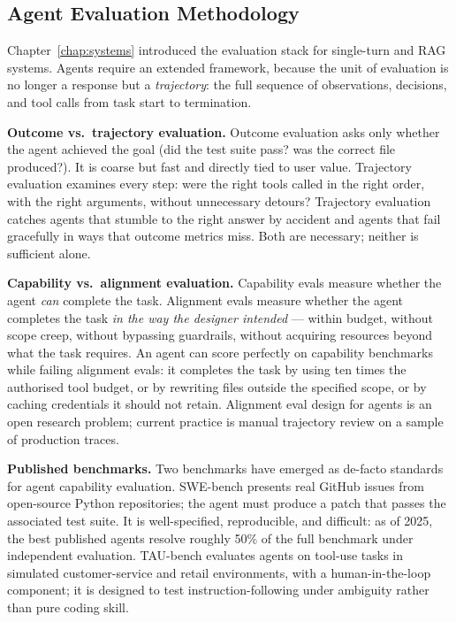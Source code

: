 \subsection{Agent Evaluation Methodology}

Chapter~\ref{chap:systems} introduced the evaluation stack for single-turn and
RAG systems. Agents require an extended framework, because the
unit of evaluation is no longer a response but a
\emph{trajectory}: the full sequence of observations, decisions,
and tool calls from task start to termination.

\textbf{Outcome vs.\ trajectory evaluation.} Outcome evaluation
asks only whether the agent achieved the goal (did the test
suite pass? was the correct file produced?). It is coarse but
fast and directly tied to user value. Trajectory evaluation
examines every step: were the right tools called in the right
order, with the right arguments, without unnecessary detours?
Trajectory evaluation catches agents that stumble to the right
answer by accident and agents that fail gracefully in ways that
outcome metrics miss. Both are necessary; neither is sufficient
alone.

\textbf{Capability vs.\ alignment evaluation.} Capability evals
measure whether the agent \emph{can} complete the task. Alignment
evals measure whether the agent completes the task \emph{in the
way the designer intended} --- within budget, without scope
creep, without bypassing guardrails, without acquiring resources
beyond what the task requires. An agent can score perfectly on
capability benchmarks while failing alignment evals: it completes
the task by using ten times the authorised tool budget, or by
rewriting files outside the specified scope, or by caching
credentials it should not retain. Alignment eval design for
agents is an open research problem; current practice is manual
trajectory review on a sample of production traces.

\textbf{Published benchmarks.} Two benchmarks have emerged as
de-facto standards for agent capability evaluation. SWE-bench
\citep{jimenez2023swebench} presents real GitHub issues from
open-source Python repositories; the agent must produce a patch
that passes the associated test suite. It is well-specified,
reproducible, and difficult: as of 2025, the best published
agents resolve roughly 50\% of the full benchmark under
independent evaluation. TAU-bench \citep{yao2024tau} evaluates
agents on tool-use tasks in simulated customer-service and retail
environments, with a human-in-the-loop component; it is
designed to test instruction-following under ambiguity rather
than pure coding skill.

